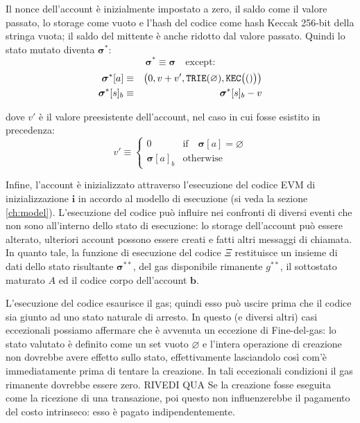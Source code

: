 \documentclass[9pt,oneside]{amsart}
\begin{document}
\begin{multicols}{2}
Il nonce dell'account è inizialmente impostato a zero, il saldo come il valore passato, lo storage come vuoto e l'hash del codice come hash Keccak 256-bit della stringa vuota; il saldo del mittente è anche ridotto dal valore passato. Quindi lo stato mutato diventa $\boldsymbol{\sigma}^*$:
\begin{equation}
\boldsymbol{\sigma}^* \equiv \boldsymbol{\sigma} \quad \text{except:}
\end{equation}
\begin{eqnarray}
\boldsymbol{\sigma}^*[a] &\equiv& \big( 0, v + v', \mathtt{\tiny TRIE}(\varnothing), \mathtt{\tiny KEC}\big(()\big) \big) \\
\boldsymbol{\sigma}^*[s]_b &\equiv& \boldsymbol{\sigma}^*[s]_b - v
\end{eqnarray}

dove $v'$ è il valore preesistente dell'account, nel caso in cui fosse esistito in precedenza:
\begin{equation}
v' \equiv \begin{cases}
0 & \text{if} \quad \boldsymbol{\sigma}[a] = \varnothing\\
\boldsymbol{\sigma}[a]_b & \text{otherwise}
\end{cases}
\end{equation}


Infine, l'account è inizializzato attraverso l'esecuzione del codice EVM di inizializzazione $\mathbf{i}$ in accordo al modello di esecuzione (si veda la sezione \ref{ch:model}). L'esecuzione del codice può influire nei confronti di diversi eventi che non sono all'interno dello stato di esecuzione: lo storage dell'account può essere alterato, ulteriori account possono essere creati e fatti altri messaggi di chiamata. In quanto tale, la funzione di esecuzione del codice $\Xi$ restituisce un insieme di dati dello stato risultante $\boldsymbol{\sigma}^{**}$, del gas disponibile rimanente $g^{**}$, il sottostato maturato $A$ ed il codice corpo dell'account $\mathbf{b}$.

L'esecuzione del codice esaurisce il gas; quindi esso può uscire prima che il codice sia giunto ad uno stato naturale di arresto. In questo (e diversi altri) casi eccezionali possiamo affermare che è avvenuta un eccezione di Fine-del-gas: lo stato valutato è definito come un set vuoto $\varnothing$ e l'intera operazione di creazione non dovrebbe avere effetto sullo stato, effettivamente lasciandolo così com'è immediatamente prima di tentare la creazione. In tali eccezionali condizioni il gas rimanente dovrebbe essere zero. RIVEDI QUA Se la creazione fosse eseguita come la ricezione di una transazione, poi questo non influenzerebbe il pagamento del costo intrinseco: esso è pagato indipendentemente.


\end{multicols}
\end{document}
